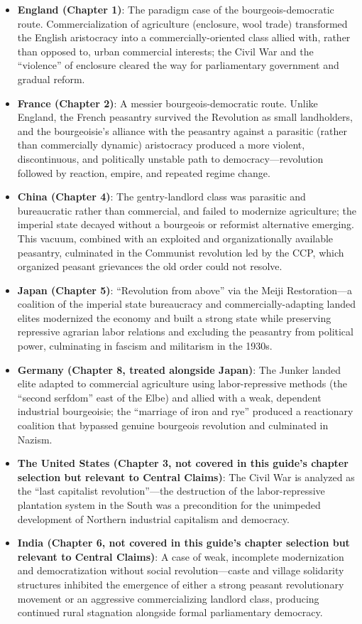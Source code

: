 \documentclass[12pt]{article}
\begin{document}
\begin{itemize}[leftmargin=*, itemsep=4pt]
    \item \textbf{England (Chapter 1)}: The paradigm case of the bourgeois-democratic route. Commercialization of agriculture (enclosure, wool trade) transformed the English aristocracy into a commercially-oriented class allied with, rather than opposed to, urban commercial interests; the Civil War and the ``violence'' of enclosure cleared the way for parliamentary government and gradual reform.
    \item \textbf{France (Chapter 2)}: A messier bourgeois-democratic route. Unlike England, the French peasantry survived the Revolution as small landholders, and the bourgeoisie's alliance with the peasantry against a parasitic (rather than commercially dynamic) aristocracy produced a more violent, discontinuous, and politically unstable path to democracy---revolution followed by reaction, empire, and repeated regime change.
    \item \textbf{China (Chapter 4)}: The gentry-landlord class was parasitic and bureaucratic rather than commercial, and failed to modernize agriculture; the imperial state decayed without a bourgeois or reformist alternative emerging. This vacuum, combined with an exploited and organizationally available peasantry, culminated in the Communist revolution led by the CCP, which organized peasant grievances the old order could not resolve.
    \item \textbf{Japan (Chapter 5)}: ``Revolution from above'' via the Meiji Restoration---a coalition of the imperial state bureaucracy and commercially-adapting landed elites modernized the economy and built a strong state while preserving repressive agrarian labor relations and excluding the peasantry from political power, culminating in fascism and militarism in the 1930s.
    \item \textbf{Germany (Chapter 8, treated alongside Japan)}: The Junker landed elite adapted to commercial agriculture using labor-repressive methods (the ``second serfdom'' east of the Elbe) and allied with a weak, dependent industrial bourgeoisie; the ``marriage of iron and rye'' produced a reactionary coalition that bypassed genuine bourgeois revolution and culminated in Nazism.
    \item \textbf{The United States (Chapter 3, not covered in this guide's chapter selection but relevant to Central Claims)}: The Civil War is analyzed as the ``last capitalist revolution''---the destruction of the labor-repressive plantation system in the South was a precondition for the unimpeded development of Northern industrial capitalism and democracy.
    \item \textbf{India (Chapter 6, not covered in this guide's chapter selection but relevant to Central Claims)}: A case of weak, incomplete modernization and democratization without social revolution---caste and village solidarity structures inhibited the emergence of either a strong peasant revolutionary movement or an aggressive commercializing landlord class, producing continued rural stagnation alongside formal parliamentary democracy.
\end{itemize}
\end{document}
